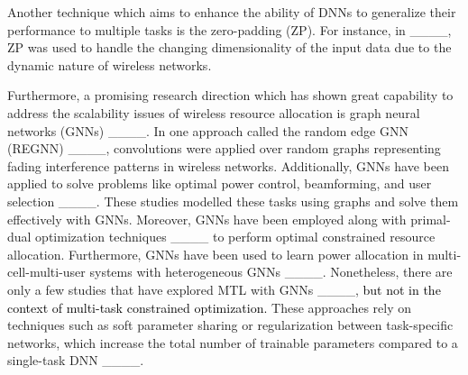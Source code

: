 Another  technique which aims to enhance the ability of DNNs to generalize their performance to multiple tasks is the zero-padding (ZP).
For instance, in ____, ZP was used to handle the changing dimensionality of the input data due to the dynamic nature of wireless networks. 

Furthermore, a promising research direction which has shown great capability to address the scalability issues of wireless resource allocation is graph neural networks (GNNs) ____. In one approach called the random edge GNN (REGNN) ____, convolutions were applied over random graphs representing fading interference patterns in wireless networks. Additionally, GNNs have been applied to solve problems like optimal power control, beamforming, and user selection ____. These studies modelled these tasks using graphs and solve them effectively with GNNs. Moreover,  
GNNs have been employed along with primal-dual optimization techniques ____ to perform optimal constrained resource allocation. Furthermore, GNNs have been used to learn power allocation in multi-cell-multi-user systems with heterogeneous GNNs ____.  Nonetheless, there are only a few studies that have explored MTL with GNNs  ____, \textcolor{black}{ but not in the context of multi-task constrained optimization.} These approaches rely on techniques such as soft parameter sharing or regularization between task-specific networks, which increase the total number of trainable parameters compared to a single-task DNN ____. 

